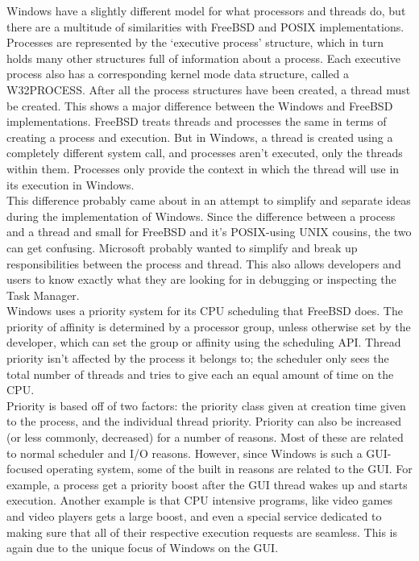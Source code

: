 \documentclass[titlepage]{article}
\begin{document}
\begin{singlespace}
    Windows have a slightly different model for what processors and threads do, but there are a multitude of similarities with FreeBSD and POSIX implementations. \\
    Processes are represented by the ‘executive process' structure, which in turn holds many other structures full of information about a process. Each executive process also has a corresponding kernel mode data structure, called a W32PROCESS. After all the process structures have been created, a thread must be created. This shows a major difference between the Windows and FreeBSD implementations. FreeBSD treats threads and processes the same in terms of creating a process and execution. But in Windows, a thread is created using a completely different system call, and processes aren't executed, only the threads within them. Processes only provide the context in which the thread will use in its execution in Windows.\\
    This difference probably came about in an attempt to simplify and separate ideas during the implementation of Windows. Since the difference between a process and a thread and small for FreeBSD and it's POSIX-using UNIX cousins, the two can get confusing. Microsoft probably wanted to simplify and break up responsibilities between the process and thread. This also allows developers and users to know exactly what they are looking for in debugging or inspecting the Task Manager.\\
    Windows uses a priority system for its CPU scheduling that FreeBSD does. The priority of affinity is determined by a processor group, unless otherwise set by the developer, which can set the group or affinity using the scheduling API. Thread priority isn't affected by the process it belongs to; the scheduler only sees the total number of threads and tries to give each an equal amount of time on the CPU. \cite{windowsch5}\\
    Priority is based off of two factors: the priority class given at creation time given to the process, and the individual thread priority. Priority can also be increased (or less commonly, decreased) for a number of reasons. Most of these are related to normal scheduler and I/O reasons. However, since Windows is such a GUI-focused operating system, some of the built in reasons are related to the GUI. For example, a process get a priority boost after the GUI thread wakes up and starts execution. Another example is that CPU intensive programs, like video games and video players gets a large boost, and even a special service dedicated to making sure that all of their respective execution requests are seamless. This is again due to the unique focus of Windows on the GUI. \\

\end{singlespace}
\end{document}
